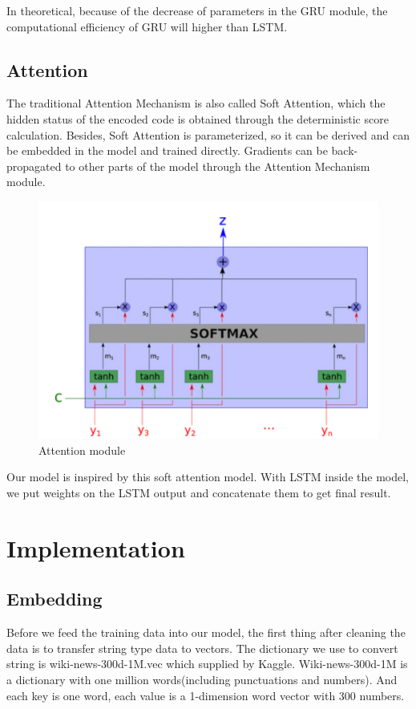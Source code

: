 \documentclass{article}
\begin{document}
\noindent In theoretical, because of the decrease of parameters in the GRU module, the computational efficiency of GRU will higher than LSTM. \\
\subsection{ Attention}
\noindent The traditional Attention Mechanism is also called Soft Attention, which the hidden status of the encoded code is obtained through the deterministic score calculation. Besides, Soft Attention is parameterized, so it can be derived and can be embedded in the model and trained directly. Gradients can be back-propagated to other parts of the model through the Attention Mechanism module.\\
\begin{figure}[H]
	\centering
	\includegraphics[scale = 0.15]{s1.png}
	\caption{ Attention module}
\end{figure}
\noindent Our model is inspired by this soft attention model. With LSTM inside the model, we put weights on the LSTM output and concatenate them to get final result.
\section{ Implementation}
\subsection{Embedding}
\noindent Before we feed the training data into our model, the first thing after cleaning the data is to transfer string type data to vectors. The dictionary we use to convert string is wiki-news-300d-1M.vec which supplied by Kaggle. Wiki-news-300d-1M is a dictionary with one million words(including punctuations and numbers). And each key is one word, each value is a 1-dimension  word vector with 300 numbers.\\
\end{document}
